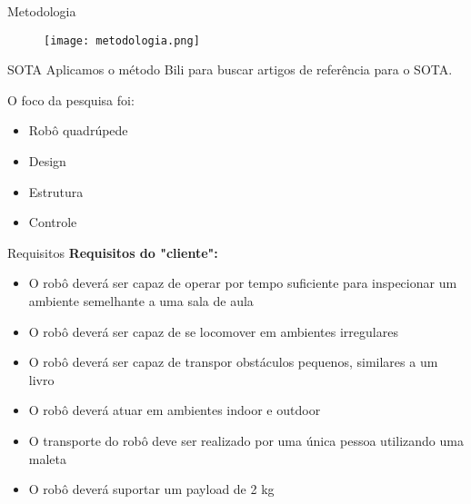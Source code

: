 \begin{frame}[t]{Metodologia}
    \begin{figure}
        \texttt{[image: metodologia.png]}
    \end{figure}
\end{frame}

\begin{frame}[t]{SOTA}
    Aplicamos o método Bili para buscar artigos de referência para o SOTA.

    O foco da pesquisa foi:
    \begin{itemize}
        \item Robô quadrúpede
        \item Design
        \item Estrutura
        \item Controle
    \end{itemize}


\end{frame}

\begin{frame}[t]{Requisitos}
    \textbf{Requisitos do "cliente":}
    \begin{itemize}
        \item O robô deverá ser capaz de operar por tempo suficiente para inspecionar um ambiente semelhante a uma sala de aula
        \item O robô deverá ser capaz de se locomover em ambientes irregulares
        \item O robô deverá ser capaz de transpor obstáculos pequenos, similares a um livro
        \item O robô deverá atuar em ambientes indoor e outdoor
        \item O transporte do robô deve ser realizado por uma única pessoa utilizando uma maleta
        \item O robô deverá suportar um payload de 2 kg
    \end{itemize}

\end{frame}

